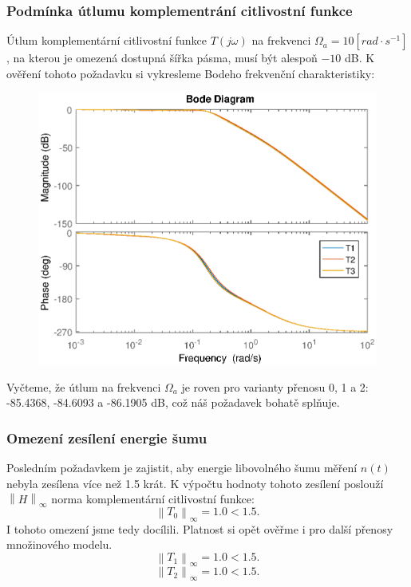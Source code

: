 \documentclass[a4paper,11pt]{article}
\begin{document}
\newpage 
\subsubsection{Podmínka útlumu komplementrání citlivostní funkce}
Útlum komplementární citlivostní funkce $ T\left ( j\omega \right ) $ na frekvenci $ \Omega _{a}=10 \left[ rad\cdot s^{-1}   \right ] $, na kterou je omezená dostupná šířka pásma, musí být alespoň $ -10 $ dB. K ověření tohoto požadavku si vykresleme Bodeho frekvenční charakteristiky:
\begin{figure}[htbp]
	\begin{center}
	\includegraphics[scale = 1.0]{obrazky/citlivostniFunkce.eps}
	\label{fig:citlivostka}
	\end{center}
\end{figure}

Vyčteme, že útlum na frekvenci $ \Omega _{a} $ je roven pro varianty přenosu 0, 1 a 2: 
-85.4368, -84.6093 a -86.1905 dB, což náš požadavek bohatě splňuje.


\subsubsection{Omezení zesílení energie šumu}
Posledním požadavkem je zajistit, aby energie libovolného šumu měření $ n\left ( t \right ) $ nebyla zesílena více než 1.5 krát. K výpočtu hodnoty tohoto zesílení poslouží $ \left \| H \right \|_{\infty } $ norma komplementární citlivostní funkce:
\begin{equation}
\left \| T_{0} \right \|_{\infty } = 1.0 <1.5.
\end{equation}
I tohoto omezení jsme tedy docílili. Platnost si opět ověřme i pro další přenosy množinového modelu.
\begin{equation}
\left \| T_{1} \right \|_{\infty } = 1.0 <1.5.
\end{equation}
\begin{equation}
\left \| T_{2} \right \|_{\infty } = 1.0 <1.5.
\end{equation}
\end{document}
